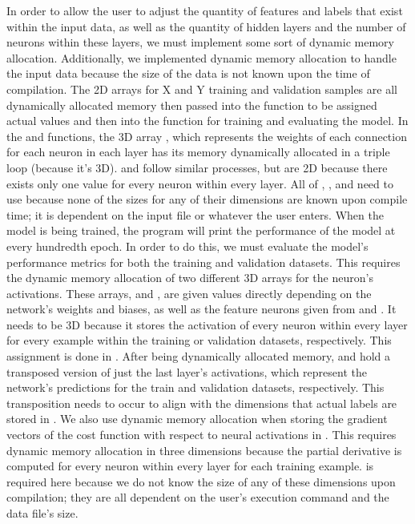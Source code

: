 \documentclass[12pt]{article}
\begin{document}
In order to allow the user to adjust the quantity of features and labels that exist within the input data, as well as the quantity of hidden layers and the number of neurons within these layers, we must implement some sort of dynamic memory allocation. Additionally, we implemented dynamic memory allocation to handle the input data because the size of the data is not known upon the time of compilation. The 2D arrays for X and Y training and validation samples are all dynamically allocated memory then passed into the  function to be assigned actual values and then into the  function for training and evaluating the model. In the  and  functions, the 3D array , which represents the weights of each connection for each neuron in each layer has its memory dynamically allocated in a triple  loop (because it’s 3D).  and  follow similar processes, but are 2D because there exists only one value for every neuron within every layer. All of , , and  need to use  because none of the sizes for any of their dimensions are known upon compile time; it is dependent on the input file  or whatever the user enters. When the model is being trained, the program will print the performance of the model at every hundredth epoch. In order to do this, we must evaluate the model’s performance metrics for both the training and validation datasets. This requires the dynamic memory allocation of two different 3D arrays for the neuron’s activations. These arrays,  and , are given values directly depending on the network’s weights and biases, as well as the feature neurons given from  and . It needs to be 3D because it stores the activation of every neuron within every layer for every example within the training or validation datasets, respectively. This assignment is done in . After being dynamically allocated memory,  and  hold a transposed version of just the last layer’s activations, which represent the network’s predictions for the train and validation datasets, respectively. This transposition needs to occur to align with the dimensions that actual labels are stored in . We also use dynamic memory allocation when storing the gradient vectors of the cost function with respect to neural activations in . This requires dynamic memory allocation in three dimensions because the partial derivative is computed for every neuron within every layer for each training example.  is required here because we do not know the size of any of these dimensions upon compilation; they are all dependent on the user’s execution command and the data file’s size.
\end{document}
